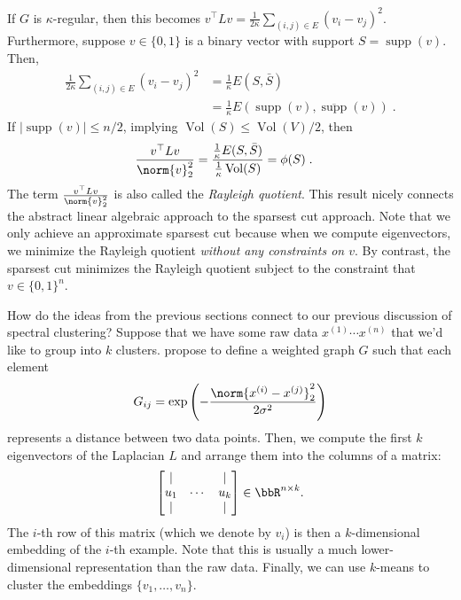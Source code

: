 If $G$ is $\kappa$-regular, then this becomes $v^\top L v = \frac{1}{2\kappa} \sum_{(i, j) \in E} (v_i - v_j)^2$. Furthermore, suppose $v \in \{0, 1\}$ is a binary vector with support $S = \operatorname{supp}(v)$. Then, 
\begin{align}
    \frac{1}{2\kappa} \sum_{(i, j) \in E} (v_i - v_j)^2 &= \frac{1}{\kappa} E(S, \bar{S}) \\
    &= \frac{1}{\kappa} E(\operatorname{supp}(v), \overline{\operatorname{supp}}(v)) \;.
\end{align}
If $|\operatorname{supp}(v)| \leq n/2$, implying $\operatorname{Vol}(S) \leq \operatorname{Vol}(V)/2$, then
\begin{align}
    \frac{v^\top L v}{\norm{v}^2_2} &= \frac{\frac{1}{\kappa} E(S, \bar{S})}{\frac{1}{\kappa} \operatorname{Vol}(S)} = \phi(S) \;.
\end{align}
The term $\frac{v^\top L v}{\norm{v}^2_2}$ is also called the {\it Rayleigh quotient}. This result nicely connects the abstract linear algebraic approach to the sparsest cut approach. Note that we only achieve an approximate sparsest cut because when we compute eigenvectors, we minimize the Rayleigh quotient \emph{without any constraints on $v$}. By contrast, the sparsest cut minimizes the Rayleigh quotient subject to the constraint that $v \in \{0,1\}^n$.


How do the ideas from the previous sections connect to our previous discussion of spectral clustering? Suppose that we have some raw data $x^{(1)} \cdots x^{(n)}$ that we'd like to group into $k$ clusters. \citet{ng2001spectral} propose to define a weighted graph $G$ such that each element 
\begin{equation}
    G_{ij} = \exp \left( -\frac{\norm{x^{(i)} - x^{(j)}}^2_2}{2\sigma^2} \right)
\end{equation}
represents a distance between two data points. Then, we compute the first $k$ eigenvectors of the Laplacian $L$ and arrange them into the columns of a matrix: 
\begin{equation}
    \begin{bmatrix} \lvert &  & \lvert \\ u_1 & \cdots &  u_k \\ \lvert &  & \lvert \end{bmatrix} \in \bbR^{n \times k}.
\end{equation} 
The $i$-th row of this matrix (which we denote by $v_i$) is then a $k$-dimensional embedding of the $i$-th example. Note that this is usually a much lower-dimensional representation than the raw data. Finally, we can use $k$-means to cluster the embeddings $\{v_1,\dots,v_n\}$.

